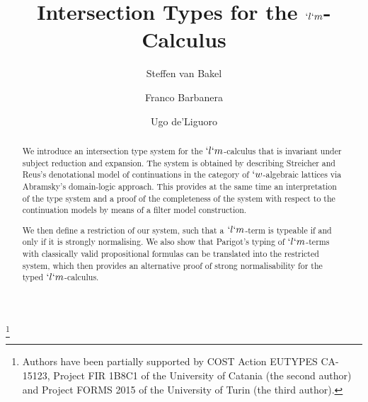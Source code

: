 \documentclass{lmcs}
\begin{document}
 \title[Intersection Types for $`l`m $] {Intersection Types for the $`l`m$-Calculus}

 \author[S. van Bakel et al.]{Steffen van Bakel}
 \address{Department of Computing, Imperial College London, 180 Queen's Gate, London SW7 2BZ, UK}	%
 \thanks{Authors have been partially supported by COST Action EUTYPES CA-15123, Project FIR 1B8C1 of the University of Catania (the second author) and Project FORMS 2015 of the University of Turin (the third author).}

 \author[]{Franco Barbanera}	
 \address{Dipartimento di Matematica e Informatica, Universit\`a degli Studi di Catania, Viale A. Doria 6, 95125 Catania, Italy}	

 \author[]{Ugo de'Liguoro}
 \address{Dipartimento di Informatica, Universit\`a degli Studi di Torino, Corso Svizzera 185, 10149 Torino, Italy}


 \begin{abstract}
We introduce an intersection type system for the $`l`m$-calculus that is invariant under subject reduction and expansion.
The system is obtained by describing Streicher and Reus's denotational model of continuations in the category of $`w$-algebraic lattices via Abramsky's domain-logic approach.
This provides at the same time an interpretation of the type system and a proof of the completeness of the system with respect to the continuation models by means of a filter model construction.

We then define a restriction of our system, such that a $`l`m$-term is typeable if and only if it is strongly normalising. 
We also show that Parigot's typing of $`l`m$-terms with classically valid propositional formulas can be translated into the restricted system, which then provides an alternative proof of strong normalisability for the typed $`l`m$-calculus.

 \end{abstract}

 \maketitle
\end{document}
